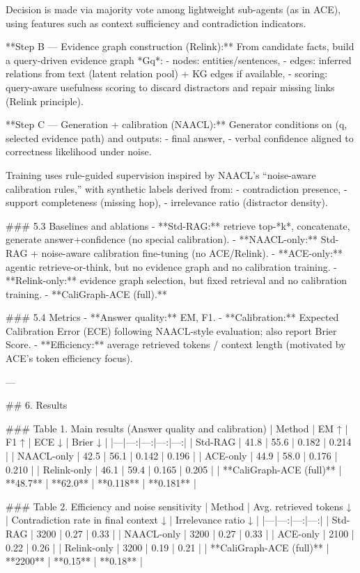Decision is made via majority vote among lightweight sub-agents (as in ACE), using features such as context sufficiency and contradiction indicators.

**Step B — Evidence graph construction (Relink):**  
From candidate facts, build a query-driven evidence graph *Gq*:
- nodes: entities/sentences,
- edges: inferred relations from text (latent relation pool) + KG edges if available,
- scoring: query-aware usefulness scoring to discard distractors and repair missing links (Relink principle).

**Step C — Generation + calibration (NAACL):**  
Generator conditions on (q, selected evidence path) and outputs:
- final answer,
- verbal confidence aligned to correctness likelihood under noise.

Training uses rule-guided supervision inspired by NAACL’s “noise-aware calibration rules,” with synthetic labels derived from:
- contradiction presence,
- support completeness (missing hop),
- irrelevance ratio (distractor density).

### 5.3 Baselines and ablations  
- **Std-RAG:** retrieve top-*k*, concatenate, generate answer+confidence (no special calibration).  
- **NAACL-only:** Std-RAG + noise-aware calibration fine-tuning (no ACE/Relink).  
- **ACE-only:** agentic retrieve-or-think, but no evidence graph and no calibration training.  
- **Relink-only:** evidence graph selection, but fixed retrieval and no calibration training.  
- **CaliGraph-ACE (full).**

### 5.4 Metrics  
- **Answer quality:** EM, F1.  
- **Calibration:** Expected Calibration Error (ECE) following NAACL-style evaluation; also report Brier Score.  
- **Efficiency:** average retrieved tokens / context length (motivated by ACE’s token efficiency focus).

---

## 6. Results  

### Table 1. Main results (Answer quality and calibration)  
| Method | EM ↑ | F1 ↑ | ECE ↓ | Brier ↓ |
|---|---:|---:|---:|---:|
| Std-RAG | 41.8 | 55.6 | 0.182 | 0.214 |
| NAACL-only | 42.5 | 56.1 | 0.142 | 0.196 |
| ACE-only | 44.9 | 58.0 | 0.176 | 0.210 |
| Relink-only | 46.1 | 59.4 | 0.165 | 0.205 |
| **CaliGraph-ACE (full)** | **48.7** | **62.0** | **0.118** | **0.181** |

### Table 2. Efficiency and noise sensitivity  
| Method | Avg. retrieved tokens ↓ | Contradiction rate in final context ↓ | Irrelevance ratio ↓ |
|---|---:|---:|---:|
| Std-RAG | 3200 | 0.27 | 0.33 |
| NAACL-only | 3200 | 0.27 | 0.33 |
| ACE-only | 2100 | 0.22 | 0.26 |
| Relink-only | 3200 | 0.19 | 0.21 |
| **CaliGraph-ACE (full)** | **2200** | **0.15** | **0.18** |

